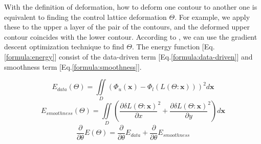 \documentclass[3p,times]{elsarticle}
\begin{document}
With the definition of deformation, how to deform one contour to
another one is equivalent to finding the control lattice deformation
$\Theta$. For example, we apply these to the upper a layer of the
pair of the contours, and the deformed upper contour coincides with
the lower contour. According to \cite{huang_shape_2006}, we can use
the gradient descent optimization technique to find $\Theta$. The
energy function [Eq.\ref{formula:energy}] consist of the data-driven term
[Eq.\ref{formula:data-driven}] and smoothness term [Eq.\ref{formula:smoothness}].

\begin{equation}
\label{formula:data-driven}
E_{data}(\Theta)=\iint\limits_D(\Phi_{u}(\mathbf{x})-\Phi_{l}(L(\Theta:\mathbf{x})))^2d\mathbf{x}
\end{equation}
\begin{equation}
\label{formula:smoothness}
E_{smoothness}(\Theta)=\iint\limits_D\left( \frac{\partial\delta L(\Theta:\mathbf{x})}{\partial x}^2+\frac{\partial\delta L(
\Theta:\mathbf{x})}{\partial y}^2\right) d\mathbf{x}
\end{equation}
\begin{equation}
\label{formula:energy}
\frac{\partial}{\partial \theta} E(\Theta)=\frac{\partial
 }{\partial \theta} E_{data}+\frac{\partial}{\partial \theta} E_{smoothness}
\end{equation}
\end{document}
